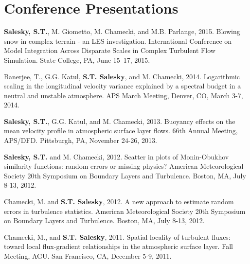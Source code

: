 \documentclass[11pt,letterpaper]{article}
\begin{document}
\section*{Conference Presentations} 



\textbf{Salesky, S.T.}, M. Giometto, M. Chamecki, and M.B. Parlange, 2015. Blowing snow in complex terrain - an LES investigation. International Conference on Model Integration Across Disparate Scales in Complex Turbulent Flow Simulation. State College, PA, June 15--17, 2015. 

Banerjee, T., G.G. Katul, \textbf{S.T. Salesky}, and M. Chamecki, 2014. Logarithmic scaling in the longitudinal velocity variance explained by a spectral budget in a neutral and unstable atmosphere. APS March Meeting, Denver, CO, March 3-7, 2014. 

\textbf{Salesky, S.T.}, G.G. Katul, and M. Chamecki, 2013. Buoyancy effects on the mean velocity profile in atmospheric surface layer flows. 66th Annual Meeting, APS/DFD. Pittsburgh, PA, November 24-26, 2013. 

\textbf{Salesky, S.T.} and M. Chamecki, 2012. Scatter in plots of Monin-Obukhov similarity functions: random errors or missing physics? American Meteorological Society 20th Symposium on Boundary Layers and Turbulence. Boston, MA, July 8-13, 2012. 

Chamecki, M. and \textbf{S.T. Salesky}, 2012. A new approach to estimate random errors in turbulence statistics. American Meteorological Society 20th Symposium on Boundary Layers and Turbulence. Boston, MA, July 8-13, 2012. 

Chamecki, M., and \textbf{S.T. Salesky}, 2011. Spatial locality of turbulent fluxes: toward local flux-gradient relationships in the atmospheric surface layer. Fall Meeting, AGU. San Francisco, CA, December 5-9, 2011. 
\end{document}
